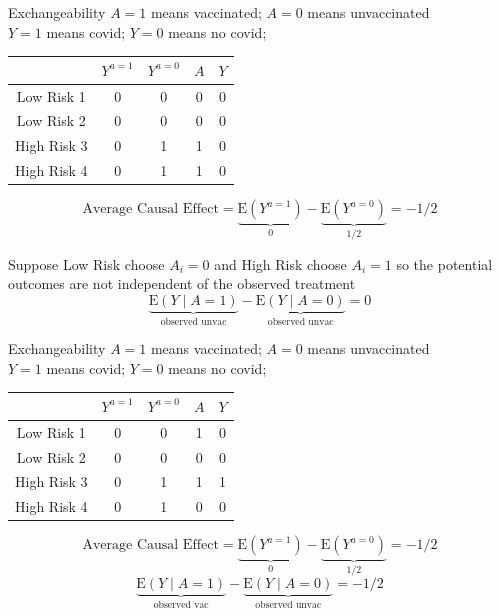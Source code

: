\documentclass{beamer}
\newcommand\E{\text{E}}
\begin{document}
\begin{frame}{Exchangeability}
$A = 1$ means vaccinated; $A = 0$ means unvaccinated\\
$Y = 1$ means covid; $Y = 0$ means no covid;
\begin{table}
\begin{tabular}[t]{c|c| c|c|c}
\toprule
& $Y^{a=1}$ & $Y^{a=0}$ & $A$ & $Y$\\
\midrule
Low Risk 1 & {\color{lightgray}0} & 0 & 0 & 0\\
Low Risk 2 &{\color{lightgray}0} & 0 & 0 & 0\\
High Risk 3 & 0 & {\color{lightgray}1} & 1 & 0\\
High Risk 4 & 0 & {\color{lightgray}1} & 1 & 0\\
\bottomrule
\end{tabular}
\end{table}

\[\text{Average Causal Effect} =\underbrace{\E(Y^{a = 1})}_{0} - \underbrace{\E(Y^{a = 0})}_{1/2} = -1/2 \]

Suppose Low Risk choose $A_i = 0$ and High Risk choose $A_i = 1$ so the potential outcomes are not independent of the observed treatment
\[\underbrace{\E(Y \mid A = 1)}_{\text{observed unvac}} - \underbrace{\E(Y \mid A = 0)}_{\text{observed unvac}} = 0 \]

\end{frame}


\begin{frame}{Exchangeability}
$A = 1$ means vaccinated; $A = 0$ means unvaccinated\\
$Y = 1$ means covid; $Y = 0$ means no covid;
\begin{table}
\begin{tabular}[t]{c|c| c|c|c}
\toprule
& $Y^{a=1}$ & $Y^{a=0}$ & $A$ & $Y$\\
\midrule
Low Risk 1 & {\color{lightgray}0} & 0 & 1 & 0\\
Low Risk 2 & 0 & {\color{lightgray}0} & 0 & 0\\
High Risk 3 & {\color{lightgray}0} & 1 & 1 & 1\\
High Risk 4 & 0 & {\color{lightgray}1} & 0 & 0\\
\bottomrule
\end{tabular}
\end{table}

\[\text{Average Causal Effect} =\underbrace{\E(Y^{a = 1})}_{0} - \underbrace{\E(Y^{a = 0})}_{1/2} = -1/2 \]
\pause 
\[\underbrace{\E(Y \mid A = 1)}_{\text{observed vac}} - \underbrace{\E(Y \mid A = 0)}_{\text{observed unvac}} = -1/2 \]






\end{frame}
\end{document}
